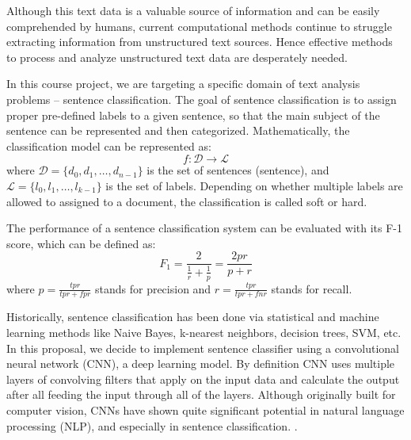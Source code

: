 \documentclass[conference]{IEEEtran}
\begin{document}
    Although this text data is a valuable source of information
    and can be easily comprehended by humans, current computational methods
    continue to struggle extracting information from unstructured text sources\cite{mitchell2015}.
    Hence effective methods to process and analyze unstructured text data are
    desperately needed.

    In this course project, we are targeting a specific domain of text analysis
    problems -- sentence classification. The goal of sentence classification is to assign
    proper pre-defined labels to a given sentence, so that the main subject of the
    sentence can be represented and then categorized\cite{allahyari2017brief}.
    Mathematically, the classification model can be represented as:
    $$f:\mathcal{D}\rightarrow\mathcal{L}$$
    where $\mathcal{D}=\{d_0, d_1,\ldots, d_{n-1}\}$ is the set of sentences
    (sentence), and $\mathcal{L}=\{l_0, l_1,\ldots, l_{k-1}\}$ is the set of labels.
    Depending on whether multiple labels are allowed to assigned to a document, the
    classification is called soft or hard\cite{gopal2010multilabel}.

    The performance of a sentence classification system can be evaluated with its
    F-1 score, which can be defined as\cite{forman2003extensive}:
    $$F_1=\frac{2}{\frac{1}{r}+\frac{1}{p}}=\frac{2pr}{p+r}$$
    where $p=\frac{tpr}{tpr+fpr}$ stands for precision and $r=\frac{tpr}{tpr+fnr}$
    stands for recall.

    Historically, sentence classification has been done via statistical
    and machine learning methods like Naive Bayes, k-nearest neighbors, decision
    trees, SVM, etc. In this proposal, we decide to implement sentence classifier
    using a convolutional neural network (CNN), a deep learning model. By definition
    CNN uses multiple layers of convolving filters that apply on the input data and
    calculate the output after all feeding the input through all of the layers. Although
    originally built for computer vision, CNNs have shown quite significant potential in
    natural language processing (NLP), and especially in sentence classification.
    \cite{kim2014convolutional}.
\end{document}

